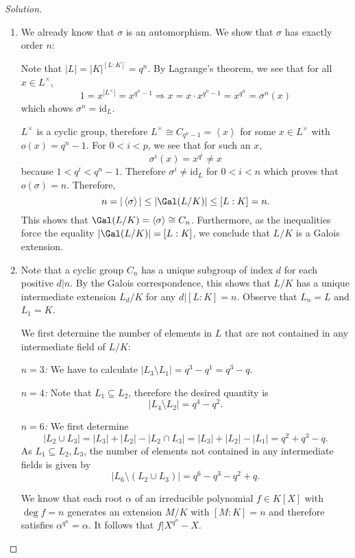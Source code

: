 \documentclass[a4paper,10pt,reqno]{amsart}
\newenvironment{sol}
  {\renewcommand\qedsymbol{$\blacksquare$}\begin{proof}[Solution]}
  {\end{proof}}
\begin{document}
\begin{sol}
    \begin{enumerate}[label=(\roman*)]
    \item We already know that $\sigma$ is an automorphism. We show that $\sigma$ has exactly order $n$:

    Note that $|L| = |K|^{[L:K]} = q^n$. By Lagrange's theorem, we see that for all $x \in L^{\times}$,
    \[
    1 = x^{|L^{\times}|} = x^{q^n-1} \Rightarrow x = x \cdot x^{q^n-1} = x^{q^n} = \sigma^n(x)
    \]
    which shows $\sigma^n = \mathrm{id}_L$.
    
    $L^{\times}$ is a cyclic group, therefore $L^{\times} \cong C_{q^n-1} = \left\langle x \right\rangle$ for some $x \in L^{\times}$ with $o(x) = q^n-1$. For $0 < i < p$, we see that for such an $x$,
    \[
    \sigma^i(x) = x^{q^i} \neq x
    \]
    because $1 < q^i < q^n-1$. Therefore $\sigma^i \neq \mathrm{id}_L$ for $0 < i < n$ which proves that $o(\sigma) = n$. Therefore,
    \[
    n = |\left\langle \sigma \right\rangle| \leq |\Gal(L/K)| \leq [L:K] = n.
    \]
    This shows that $\Gal(L/K) = \left\langle \sigma \right\rangle \cong C_n$. Furthermore, as the inequalities force the equality $|\Gal(L/K)| = [L:K]$, we conclude that $L/K$ is a Galois extension.
    \item Note that a cyclic group $C_n$ has a unique subgroup of index $d$ for each positive $d|n$. By the Galois correspondence, this shows that $L/K$ has a unique intermediate extension $L_d/K$ for any $d|[L:K] = n$. Observe that $L_n = L$ and $L_1 = K$.

    We first determine the number of elements in $L$ that are not contained in any intermediate field of $L/K$:

    \textit{$n=3$:} We have to calculate $|L_3 \setminus L_1| = q^3 - q^1 = q^3-q$.

    \textit{$n=4$:} Note that $L_1 \subseteq L_2$, therefore the desired quantity is
    \[
    |L_4 \setminus L_2 | = q^4 - q^2.
    \]

    \textit{$n=6$:} We first determine
    \[
    |L_2 \cup L_3| = |L_3| + |L_2| - |L_2 \cap L_3| = |L_3| + |L_2| - |L_1| = q^2 + q^3 - q.
    \]
    As $L_1 \subseteq L_2,L_3$, the number of elements not contained in any intermediate fields is given by
    \[
    |L_6 \setminus (L_2 \cup L_3)| = q^6 - q^3 - q^2 + q.
    \]

    We know that each root $\alpha$ of an irreducible polynomial $f \in K[X]$ with $\deg f = n$ generates an extension $M/K$ with $[M:K] = n$ and therefore satisfies $\alpha^{q^n} = \alpha$. It follows that $f | X^{q^n} - X$.


\end{enumerate}
\end{sol}
\end{document}
